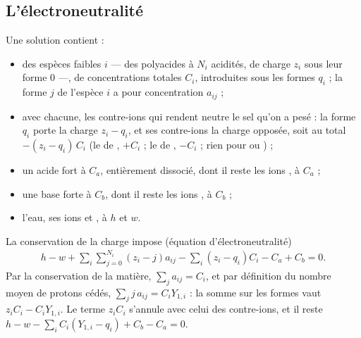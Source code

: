 \documentclass[a4paper,11pt]{article}
\newcommand\pare[1]{\left(#1\right)}
\begin{document}
\subsection{L'électroneutralité}
Une solution contient :
\begin{itemize}
\item des espèces faibles $i$ — des polyacides à $N_i$ acidités, de charge $z_i$ sous leur forme 0 —, de concentrations totales $C_i$, introduites sous les formes $q_i$ ; la forme $j$ de l'espèce $i$ a pour concentration $a_{ij}$ ;
\item avec chacune, les contre-ions qui rendent neutre le sel qu'on a pesé : la forme $q_i$ porte la charge $z_i-q_i$, et ses contre-ions la charge opposée, soit au total $-(z_i-q_i)\,C_i$ (le  de , $+C_i$ ; le  de , $-C_i$ ; rien pour  ou ) ;
\item un acide fort  à $C_a$, entièrement dissocié, dont il reste les ions , à $C_a$ ;
\item une base forte  à $C_b$, dont il reste les ions , à $C_b$ ;
\item l'eau, ses ions  et , à $h$ et $w$.
\end{itemize}
La conservation de la charge impose (équation d'électroneutralité)
\begin{align}
h-w+\sum_i\sum_{j=0}^{N_i}\pare{z_i-j}a_{ij}-\sum_i\pare{z_i-q_i}C_i-C_a+C_b=0.
\end{align}
Par la conservation de la matière, $\sum_ja_{ij}=C_i$, et par définition du nombre moyen de protons cédés, $\sum_jj\,a_{ij}=C_iY_{1,i}$ : la somme sur les formes vaut $z_iC_i-C_iY_{1,i}$.
Le terme $z_iC_i$ s'annule avec celui des contre-ions, et il reste $h-w-\sum_iC_i\pare{Y_{1,i}-q_i}+C_b-C_a=0$.
\end{document}
